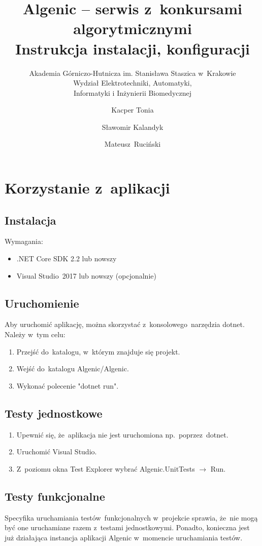 \documentclass{article}
\title{Algenic -- serwis z~konkursami algorytmicznymi\\
Instrukcja instalacji, konfiguracji}
\subtitle{Akademia Górniczo-Hutnicza im. Stanisława Staszica w~Krakowie\\
	Wydział Elektrotechniki, Automatyki,\\
	Informatyki i Inżynierii Biomedycznej}
\author{Kacper Tonia\and
		Sławomir Kalandyk\and
		Mateusz~Ruciński}
\date{}
\begin{document}
\maketitle

\section{Korzystanie z~aplikacji}
\subsection{Instalacja}
Wymagania:
\begin{itemize}
    \item .NET Core SDK 2.2 lub nowszy
    \item Visual Studio~2017 lub nowszy (opcjonalnie)
\end{itemize}

\subsection{Uruchomienie}
Aby uruchomić aplikację, można skorzystać z~konsolowego~narzędzia dotnet. Należy w~tym celu:
\begin{enumerate}
    \item Przejść do~katalogu, w~którym znajduje się projekt.
    \item Wejść do~katalogu Algenic/Algenic.
    \item Wykonać polecenie "dotnet run".
\end{enumerate}

\subsection{Testy jednostkowe}
\begin{enumerate}
    \item Upewnić się, że~aplikacja nie jest uruchomiona np.~poprzez~dotnet.
    \item Uruchomić Visual Studio.
    \item Z~poziomu okna Test Explorer wybrać Algenic.UnitTests $\rightarrow$ Run.
\end{enumerate}

\subsection{Testy funkcjonalne}
Specyfika uruchamiania testów~funkcjonalnych w~projekcie sprawia, że~nie mogą być one uruchamiane razem z~testami jednostkowymi. Ponadto, konieczna jest już działająca instancja aplikacji Algenic w~momencie uruchamiania testów.
\end{document}
